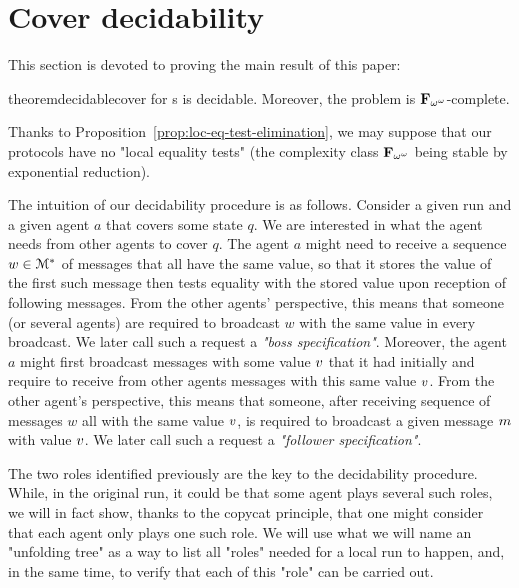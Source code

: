 \section{Cover decidability}
\label{sec:cover-decidability}

This section is devoted to proving the main result of this paper:

\begin{restatable}{theorem}{decidablecover}
\COVER for \BNRA{}s is decidable. Moreover, the problem is $\mathbf{F}_{\omega^\omega}$-complete.
\end{restatable}

Thanks to Proposition~\ref{prop:loc-eq-test-elimination}, we may suppose that our protocols have no "local equality tests" (the complexity class $\mathbf{F}_{\omega^{\omega}}$ being stable by exponential reduction). 

The intuition of our decidability procedure is as follows. 
Consider a given run and a given agent $a$ that covers some state $q$. We are interested in what the agent needs from other agents to cover $q$. The agent $a$ might need to receive a sequence $w \in \mathcal{M}^*$ of messages that all have the same value, so that it stores the value of the first such message then tests equality with the stored value upon reception of following messages. 
From the other agents' perspective, this means that someone (or several agents) are required to broadcast $w$ with the same value in every broadcast. We later call such a request a \emph{"boss specification"}.  
Moreover, the agent $a$ might first broadcast messages with some value $v$ that it had initially and require to receive from other agents messages with this same value $v$. 
From the other agent's perspective, this means that someone, after receiving sequence of messages $w$ all with the same value $v$, is required to broadcast a given message $m$ with value $v$. We later call such a request a \emph{"follower specification"}.

The two roles identified previously are the key to the decidability procedure. While, in the original run, it could be that some agent plays several such roles, we will in fact show, thanks to the copycat principle, that one might consider that each agent only plays one such role. We will use what we will name an "unfolding tree" as a way to list all "roles" needed for a local run to happen, and, in the same time, to verify that each of this "role" can be carried out.

